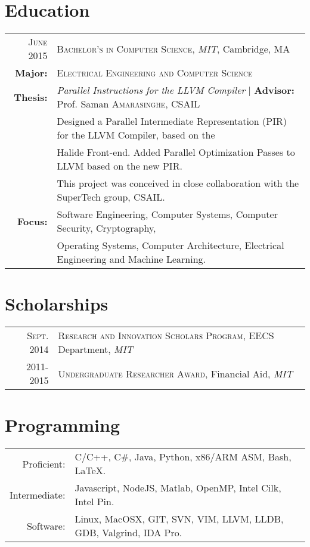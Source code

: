 \documentclass[lettersize,10pt]{article}
\begin{document}
\section{Education}
\begin{tabular}{rl}	
\textsc{June} 2015 & \textsc{Bachelor's in Computer Science}, \emph{MIT}, Cambridge, MA\\
\textbf{Major:} & \textsc{Electrical Engineering and Computer Science}\\
\textbf{Thesis:} & \emph{Parallel Instructions for the LLVM Compiler} | \textbf{Advisor:} Prof. Saman \textsc{Amarasinghe}, CSAIL\\
& Designed a Parallel Intermediate Representation (PIR) for the LLVM Compiler, based on the \\
& Halide Front-end. Added Parallel Optimization Passes to LLVM based on the new PIR. \\
& This project was conceived in close collaboration with the SuperTech group, CSAIL. \\
\textbf{Focus:} &  Software Engineering, Computer Systems, Computer Security, Cryptography, \\
& Operating Systems, Computer Architecture, Electrical Engineering and Machine Learning.\\
\end{tabular}

\section{Scholarships}
\begin{tabular}{rl}
 \textsc{Sept.} 2014 & \textsc{Research and Innovation Scholars Program}, EECS Department, \emph{MIT}\\
2011-2015 & \textsc{Undergraduate Researcher Award}, Financial Aid, \emph{MIT}\\
\end{tabular}

\section{Programming}
\begin{tabular}{rl}
Proficient:& C/C++, C\#, Java, Python, x86/ARM ASM, Bash, \LaTeX.\\
Intermediate:& Javascript, NodeJS, Matlab, OpenMP, Intel Cilk, Intel Pin.\\
Software:& Linux, MacOSX, GIT, SVN, VIM, LLVM, LLDB, GDB, Valgrind, IDA Pro.\\
\end{tabular}
\end{document}

